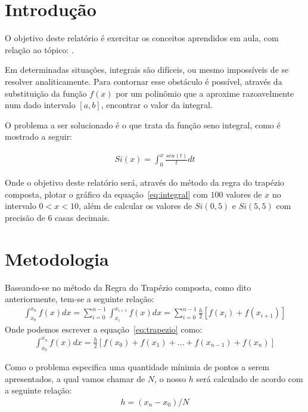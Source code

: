 \documentclass[12pt, hidelinks]{article}
\makeatletter
\let\thetitle\@title
\makeatother
\begin{document}
\section{Introdução}

O objetivo deste relatório é exercitar os conceitos aprendidos em aula, com relação ao tópico: \thetitle.

Em determinadas situações, integrais são difíceis, ou mesmo impossíveis de se resolver analiticamente. Para contornar esse obstáculo é possível, através da substituição da função $f(x)$ por um polinômio que a aproxime razoavelmente num dado intervalo $[a, b]$, encontrar o valor da integral.

O problema a ser solucionado é o que trata da função seno integral, como é mostrado a seguir:

\begin{eqnarray}\label{eq:integral}
  Si(x) = \int_{0}^{x} \frac{sen(t)}{t}dt
\end{eqnarray}

Onde o objetivo deste relatório será, através do método da regra do trapézio composta, plotar o gráfico da equação~\eqref{eq:integral} com $100$ valores de $x$ no intervalo $0 < x < 10$, além de calcular os valores de $Si(0,5)$ e $Si(5,5)$ com precisão de $6$ casas decimais.

\section{Metodologia}
Baseando-se no método da Regra do Trapézio composta, como dito anteriormente, tem-se a seguinte relação:
\begin{eqnarray}\label{eq:trapezio}
  \int_{x_0}^{x_n} f(x)dx = \sum\limits_{i=0}^{n-1}\int_{x_i}^{x_{i+1}} f(x)dx = \sum\limits_{i=0}^{n-1}\frac{h}{2}[f(x_i) + f(x_{i+1})]
\end{eqnarray}
Onde podemos escrever a equação~\eqref{eq:trapezio} como:
\begin{eqnarray}\label{eq:trapcomposta}
  \int_{x_0}^{x_n} f(x)dx = \frac{h}{2}[f(x_0) + f(x_1) + \hdots + f(x_{n-1}) + f(x_n)]
\end{eqnarray}

Como o problema especifica uma quantidade mínimia de pontos a serem apresentados, a qual vamos chamar de $N$, o nosso $h$ será calculado de acordo com a seguinte relação:
\begin{eqnarray}\label{eq:h}
  h = (x_n - x_0)/N
\end{eqnarray}
\end{document}
